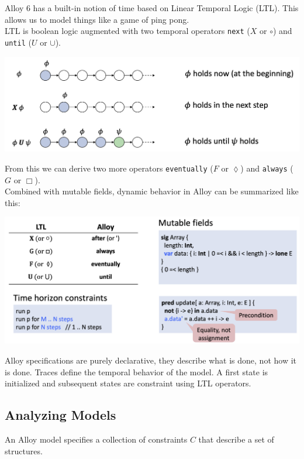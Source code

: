 Alloy 6 has a built-in notion of time based on Linear Temporal Logic (LTL). This allows us to model things like a game of ping pong. \\

LTL is boolean logic augmented with two temporal operators \texttt{next} ($X$ or $\circ$) and \texttt{until} ($U$ or $\cup$).
\begin{center}
	\includegraphics[width=\columnwidth]{assets/ltl}
\end{center}

From this we can derive two more operators \texttt{eventually} ($F$ or $\lozenge$) and \texttt{always} ($G$ or $\Box$). \\

Combined with mutable fields, dynamic behavior in Alloy can be summarized like this:
\begin{center}
	\includegraphics[width=\columnwidth]{assets/dynamic_alloy}
\end{center}

Alloy specifications are purely declarative, they describe what is done, not how it is done. Traces define the temporal behavior of the model. A first state is initialized and subsequent states are constraint using LTL operators.


\subsection{Analyzing Models}

An Alloy model specifies a collection of constraints $C$ that describe a set of structures.\\

